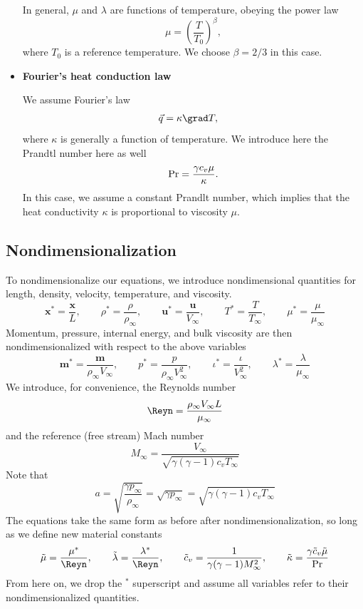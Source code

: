 \begin{itemize}
In general, $\mu$ and $\lambda$ are functions of temperature, obeying the power law
\[
\mu = \left(\frac{T}{T_0}\right)^\beta,
\]
where $T_0$ is a reference temperature. We choose $\beta = 2/3$ in this case. 

\item \textbf{Fourier's heat conduction law}

We assume Fourier's law 
\begin{align*}
\vec{q} &= \kappa \grad T,
\end{align*}
where $\kappa$ is generally a function of temperature. We introduce here the Prandtl number here as well
\[
{\rm Pr} = \frac{\gamma c_v \mu}{\kappa}.
\]
In this case, we assume a constant Prandlt number, which implies that the heat conductivity $\kappa$ is proportional to viscosity $\mu$.

\end{itemize}

\subsection{Nondimensionalization}
To nondimensionalize our equations, we introduce nondimensional quantities for length, density, velocity, temperature, and viscosity. 
\[
\boldsymbol x^* = \frac{\boldsymbol x}{L}, \qquad \rho^* = \frac{\rho}{\rho_{\infty}}, \qquad \boldsymbol u^* = \frac{\boldsymbol u}{V_\infty}, \qquad T^* = \frac{T}{T_\infty}, \qquad \mu^* = \frac{\mu}{\mu_\infty}
\]
Momentum, pressure, internal energy, and bulk viscosity are then nondimensionalized with respect to the above variables
\[
\boldsymbol m^* = \frac{\boldsymbol m}{\rho_\infty V_\infty}, \qquad p^* = \frac{p}{\rho_\infty V_\infty^2}, \qquad \iota^* = \frac{\iota}{V_\infty^2}, \qquad \lambda^* = \frac{\lambda}{\mu_\infty}
\]
We introduce, for convenience, the Reynolds number
\[
\Reyn = \frac{\rho_\infty V_\infty L}{\mu_\infty} 
\]
and the reference (free stream) Mach number
\[
M_\infty = \frac{V_\infty}{\sqrt{\gamma(\gamma-1)c_vT_\infty}}
\]
Note that 
\[
a = \sqrt{\frac{\gamma p_\infty}{\rho_\infty}} = \sqrt{{\gamma p_\infty}} = \sqrt{\gamma(\gamma-1)c_vT_\infty}
\]
The equations take the same form as before after nondimensionalization, so long as we define new material constants
\[
\tilde{\mu} = \frac{\mu^*}{\Reyn}, \qquad \tilde{\lambda} = \frac{\lambda^*}{\Reyn}, \qquad \tilde{c}_v = \frac{1}{\gamma(\gamma-1)M_\infty^2}, \qquad \tilde{\kappa} = \frac{\gamma\tilde{c}_v\tilde{\mu}}{\rm Pr}
\]
From here on, we drop the $^*$ superscript and assume all variables refer to their nondimensionalized quantities.

